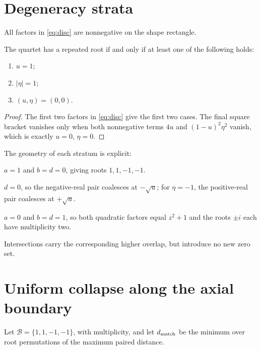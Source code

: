 \documentclass[12pt]{article}
\theoremstyle{remark}\newtheorem{remark}[theorem]{Remark}
\begin{document}
\section{Degeneracy strata}

All factors in \eqref{eq:disc} are nonnegative on the shape rectangle.

\begin{corollary}\label{cor:strata}
The quartet has a repeated root if and only if at least one of the following
holds:
\begin{enumerate}[leftmargin=2em]
\item $u=1$;
\item $|\eta|=1$;
\item $(u,\eta)=(0,0)$.
\end{enumerate}
\end{corollary}
\begin{proof}
The first two factors in \eqref{eq:disc} give the first two cases.  The final
square bracket vanishes only when both nonnegative terms $4u$ and
$(1-u)^2\eta^2$ vanish, which is exactly $u=0$, $\eta=0$.
\end{proof}

The geometry of each stratum is explicit:
\begin{description}[leftmargin=3.2em,style=nextline]
\item[$u=1$]
$a=1$ and $b=d=0$, giving roots $1,1,-1,-1$.
\item[$\eta=1$]
$d=0$, so the negative-real pair coalesces at $-\sqrt u$; for $\eta=-1$,
the positive-real pair coalesces at $+\sqrt u$.
\item[$(u,\eta)=(0,0)$]
$a=0$ and $b=d=1$, so both quadratic factors equal $z^2+1$ and the roots
$\pm i$ each have multiplicity two.
\end{description}

Intersections carry the corresponding higher overlap, but introduce no new
zero set.

\section{Uniform collapse along the axial boundary}

Let $\mathcal B=\{1,1,-1,-1\}$, with multiplicity, and let
$d_{\rm match}$ be the minimum over root permutations of the maximum paired
distance.
\end{document}
